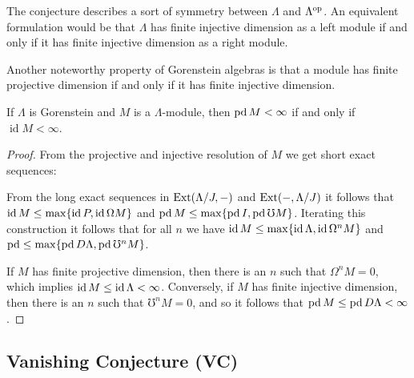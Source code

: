 The conjecture describes a sort of symmetry between $\Lambda$ and $\Lambda^{\operatorname{op}}$. An equivalent formulation would be that $\Lambda$ has finite injective dimension as a left module if and only if it has finite injective dimension as a right module.

Another noteworthy property of Gorenstein algebras is that a module has finite projective dimension if and only if it has finite injective dimension.

\begin{prop}\label{prop:Gorenstein_projdim_iff_injdim}
	If $\Lambda$ is Gorenstein and $M$ is a $\Lambda$-module, then $\operatorname{pd} M < \infty$ if and only if $\operatorname{id} M < \infty$.
	\begin{proof}
		From the projective and injective resolution of $M$ we get short exact sequences:
		\begin{center}
		\end{center}
		From the long exact sequences in $\operatorname{Ext}(\Lambda/J, -)$ and $\operatorname{Ext}(-, \Lambda/J)$ it follows that $\operatorname{id} M \leq \max\{\operatorname{id} P, \operatorname{id} \Omega M\}$ and $\operatorname{pd} M \leq \max\{\operatorname{pd} I, \operatorname{pd} \mho M\}$. Iterating this construction it follows that for all $n$ we have $\operatorname{id} M \leq \max\{ \operatorname{id} \Lambda, \operatorname{id} \Omega^n M  \}$ and $\operatorname{pd} \leq \max\{\operatorname{pd} D\Lambda, \operatorname{pd}\mho^n M\}$.

		If $M$ has finite projective dimension, then there is an $n$ such that $\Omega^n M = 0$, which implies $\operatorname{id} M \leq \operatorname{id} \Lambda < \infty$. Conversely, if $M$ has finite injective dimension, then there is an $n$ such that $\mho^n M = 0$, and so it follows that $\operatorname{pd} M \leq \operatorname{pd} D\Lambda < \infty$.
	\end{proof}
\end{prop}


\subsection*{Vanishing Conjecture (VC)}

